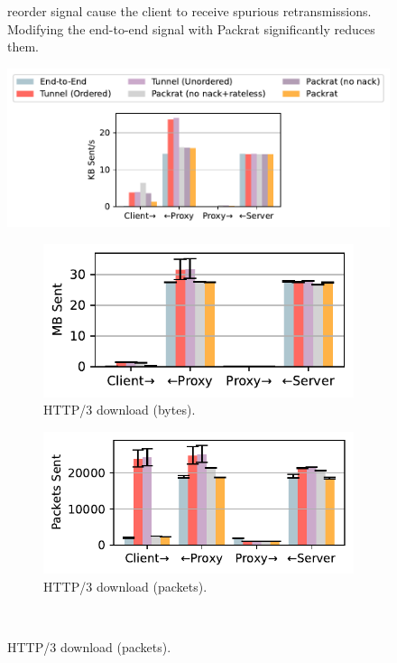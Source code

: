 \begin{figure}[ht]
\begin{minipage}[t]{0.3\textwidth}
{     reorder signal cause the client to receive spurious retransmissions.
     Modifying the end-to-end signal with Packrat significantly reduces them.}
    \label{fig:packrat:spurious}
\end{minipage}%
\hfill
\begin{minipage}[t]{0.68\textwidth}
    \centering
    \includegraphics[width=0.9\linewidth, trim=5 140 5 5, clip]{packrat/figures/network_stats_media_legend.pdf}
    
    \begin{subfigure}[b]{0.48\linewidth}
        \centering
        \includegraphics[width=\linewidth]{packrat/figures/network_stats_http_tx_bytes.pdf}
        \caption{HTTP/3 download (bytes).}
        \label{fig:packrat:link-overheads:http-bytes}
    \end{subfigure}
    \begin{subfigure}[b]{0.51\linewidth}
        \centering
        \includegraphics[width=\linewidth]{packrat/figures/network_stats_http_tx_packets.pdf}
        \caption{HTTP/3 download (packets).}
        \label{fig:packrat:link-overheads:http-packets}
    \end{subfigure}\\


\end{minipage}
\end{figure}
